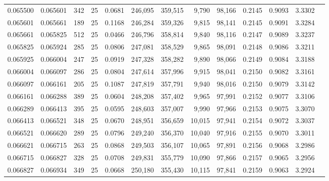 \begin{tabular}{rrrrrrrrrrrrr}
0.065500 & 0.065601 &   342 &  25 &                                     0.0681 & 246,095 & 359,515 &   9,790 &  98,166 & 0.2145 & 0.9093 & 3.3302 \\
0.065601 & 0.065661 &   189 &  25 &                                     0.1168 & 246,284 & 359,326 &   9,815 &  98,141 & 0.2145 & 0.9091 & 3.3284 \\
0.065661 & 0.065825 &   512 &  25 &                                     0.0466 & 246,796 & 358,814 &   9,840 &  98,116 & 0.2147 & 0.9089 & 3.3237 \\
0.065825 & 0.065924 &   285 &  25 &                                     0.0806 & 247,081 & 358,529 &   9,865 &  98,091 & 0.2148 & 0.9086 & 3.3211 \\
0.065925 & 0.066004 &   247 &  25 &                                     0.0919 & 247,328 & 358,282 &   9,890 &  98,066 & 0.2149 & 0.9084 & 3.3188 \\
0.066004 & 0.066097 &   286 &  25 &                                     0.0804 & 247,614 & 357,996 &   9,915 &  98,041 & 0.2150 & 0.9082 & 3.3161 \\
0.066097 & 0.066161 &   205 &  25 &                                     0.1087 & 247,819 & 357,791 &   9,940 &  98,016 & 0.2150 & 0.9079 & 3.3142 \\
0.066161 & 0.066288 &   389 &  25 &                                     0.0604 & 248,208 & 357,402 &   9,965 &  97,991 & 0.2152 & 0.9077 & 3.3106 \\
0.066289 & 0.066413 &   395 &  25 &                                     0.0595 & 248,603 & 357,007 &   9,990 &  97,966 & 0.2153 & 0.9075 & 3.3070 \\
0.066413 & 0.066521 &   348 &  25 &                                     0.0670 & 248,951 & 356,659 &  10,015 &  97,941 & 0.2154 & 0.9072 & 3.3037 \\
0.066521 & 0.066620 &   289 &  25 &                                     0.0796 & 249,240 & 356,370 &  10,040 &  97,916 & 0.2155 & 0.9070 & 3.3011 \\
0.066621 & 0.066715 &   263 &  25 &                                     0.0868 & 249,503 & 356,107 &  10,065 &  97,891 & 0.2156 & 0.9068 & 3.2986 \\
0.066715 & 0.066827 &   328 &  25 &                                     0.0708 & 249,831 & 355,779 &  10,090 &  97,866 & 0.2157 & 0.9065 & 3.2956 \\
0.066827 & 0.066934 &   349 &  25 &                                     0.0668 & 250,180 & 355,430 &  10,115 &  97,841 & 0.2159 & 0.9063 & 3.2924 \\

\end{tabular}
